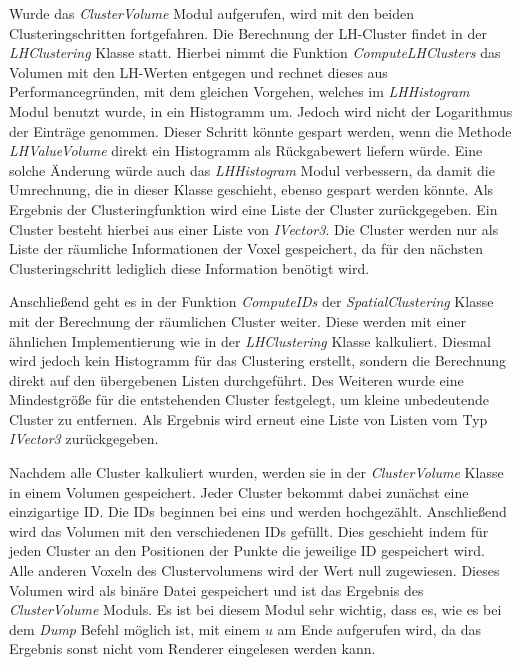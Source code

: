 Wurde das \textit{ClusterVolume} Modul aufgerufen, wird mit den beiden Clusteringschritten fortgefahren.
\newline
Die Berechnung der LH-Cluster findet in der \textit{LHClustering} Klasse statt. Hierbei nimmt die Funktion \textit{ComputeLHClusters} das Volumen mit den LH-Werten entgegen und rechnet dieses aus Performancegründen, mit dem gleichen Vorgehen, welches im \textit{LHHistogram} Modul benutzt wurde, in ein Histogramm um. Jedoch wird nicht der Logarithmus der Einträge genommen.
\newline
Dieser Schritt könnte gespart werden, wenn die Methode \textit{LHValueVolume} direkt ein Histogramm als Rückgabewert liefern würde. Eine solche Änderung würde auch das \textit{LHHistogram} Modul verbessern, da damit die Umrechnung, die in dieser Klasse geschieht, ebenso gespart werden könnte.
\newline
Als Ergebnis der Clusteringfunktion wird eine Liste der Cluster zurückgegeben. Ein Cluster besteht hierbei aus einer Liste von \textit{IVector3}. Die Cluster werden nur als Liste der räumliche Informationen der Voxel gespeichert, da für den nächsten Clusteringschritt  lediglich diese Information benötigt wird. 


Anschließend geht es in der Funktion \textit{ComputeIDs} der \textit{SpatialClustering} Klasse mit der Berechnung der räumlichen Cluster weiter. Diese werden mit einer ähnlichen Implementierung wie in der \textit{LHClustering} Klasse kalkuliert. Diesmal wird jedoch kein Histogramm für das Clustering erstellt, sondern die Berechnung direkt auf den übergebenen Listen durchgeführt.
\newline
Des Weiteren wurde eine Mindestgröße für die entstehenden Cluster festgelegt, um kleine unbedeutende Cluster zu entfernen.
\newline
Als Ergebnis wird erneut eine Liste von Listen vom Typ \textit{IVector3} zurückgegeben.


Nachdem alle Cluster kalkuliert wurden, werden sie in der \textit{ClusterVolume} Klasse in einem Volumen gespeichert. Jeder Cluster bekommt dabei zunächst eine einzigartige ID. Die IDs beginnen bei eins und werden hochgezählt.
\newline
Anschließend wird das Volumen mit den verschiedenen IDs gefüllt. Dies geschieht indem für jeden Cluster an den Positionen der Punkte die jeweilige ID gespeichert wird. Alle anderen Voxeln des Clustervolumens wird der Wert null zugewiesen.
\newline
Dieses Volumen wird als binäre Datei gespeichert und ist das Ergebnis des \textit{ClusterVolume} Moduls. Es ist bei diesem Modul sehr wichtig, dass es, wie es bei dem \textit{Dump} Befehl möglich ist, mit einem $u$ am Ende aufgerufen wird, da das Ergebnis sonst nicht vom Renderer eingelesen werden kann.


